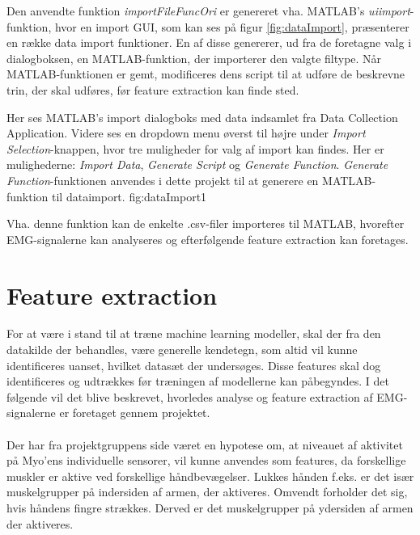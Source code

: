 Den anvendte funktion \textit{importFileFuncOri} er genereret vha. MATLAB's \textit{uiimport}-funktion\citep{matlabUiimport}, hvor en import GUI, som kan ses på figur \ref{fig:dataImport}, præsenterer en række data import funktioner. En af disse genererer, ud fra de foretagne valg i dialogboksen, en MATLAB-funktion, der importerer den valgte filtype. Når MATLAB-funktionen er gemt, modificeres dens script til at udføre de beskrevne trin, der skal udføres, før feature extraction kan finde sted.

{
	Her ses MATLAB's import dialogboks med data indsamlet fra Data Collection Application. Videre ses en dropdown menu øverst til højre under \textit{Import Selection}-knappen, hvor tre muligheder for valg af import kan findes. Her er mulighederne: \textit{Import Data}, \textit{Generate Script} og \textit{Generate Function}. \textit{Generate Function}-funktionen anvendes i dette projekt til at generere en MATLAB-funktion til dataimport.
 }{fig:dataImport}{1}

Vha. denne funktion kan de enkelte .csv-filer importeres til MATLAB, hvorefter EMG-signalerne kan analyseres og efterfølgende feature extraction kan foretages.

\section{Feature extraction}
\label{sec:featurex}

For at være i stand til at træne machine learning modeller, skal der fra den datakilde der behandles, være generelle kendetegn, som altid vil kunne identificeres uanset, hvilket datasæt der undersøges. Disse features skal dog identificeres og udtrækkes før træningen af modellerne kan påbegyndes. I det følgende vil det blive beskrevet, hvorledes analyse og feature extraction af EMG-signalerne er foretaget gennem projektet.
\\\\
Der har fra projektgruppens side været en hypotese om, at niveauet af aktivitet på Myo'ens individuelle sensorer, vil kunne anvendes som features, da forskellige muskler er aktive ved forskellige håndbevægelser. Lukkes hånden f.eks. er det især muskelgrupper på indersiden af armen, der aktiveres. Omvendt forholder det sig, hvis håndens fingre strækkes. Derved er det muskelgrupper på ydersiden af armen der aktiveres.


